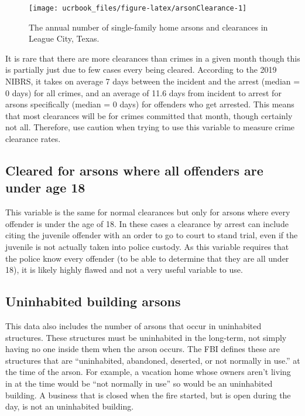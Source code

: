 \documentclass[
  12pt,
  openany]{book}
\begin{document}
\begin{figure}

{\centering \texttt{[image: ucrbook\_files/figure-latex/arsonClearance-1]} 

}

\caption{The annual number of single-family home arsons and clearances in League City, Texas.}\label{fig:arsonClearance}
\end{figure}

It is rare that there are more clearances than crimes in a given month though this is partially just due to few cases every being cleared. According to the 2019 NIBRS, it takes on average 7 days between the incident and the arrest (median = 0 days) for all crimes, and an average of 11.6 days from incident to arrest for arsons specifically (median = 0 days) for offenders who get arrested. This means that most clearances will be for crimes committed that month, though certainly not all. Therefore, use caution when trying to use this variable to measure crime clearance rates.

\hypertarget{cleared-for-arsons-where-all-offenders-are-under-age-18}{%
\subsection{Cleared for arsons where all offenders are under age 18}\label{cleared-for-arsons-where-all-offenders-are-under-age-18}}

This variable is the same for normal clearances but only for arsons where every offender is under the age of 18. In these cases a clearance by arrest can include citing the juvenile offender with an order to go to court to stand trial, even if the juvenile is not actually taken into police custody. As this variable requires that the police know every offender (to be able to determine that they are all under 18), it is likely highly flawed and not a very useful variable to use.

\hypertarget{uninhabited-building-arsons}{%
\subsection{Uninhabited building arsons}\label{uninhabited-building-arsons}}

This data also includes the number of arsons that occur in uninhabited structures. These structures must be uninhabited in the long-term, not simply having no one inside them when the arson occurs. The FBI defines these are structures that are ``uninhabited, abandoned, deserted, or not normally in use.'' at the time of the arson. For example, a vacation home whose owners aren't living in at the time would be ``not normally in use'' so would be an uninhabited building. A business that is closed when the fire started, but is open during the day, is not an uninhabited building.
\end{document}
